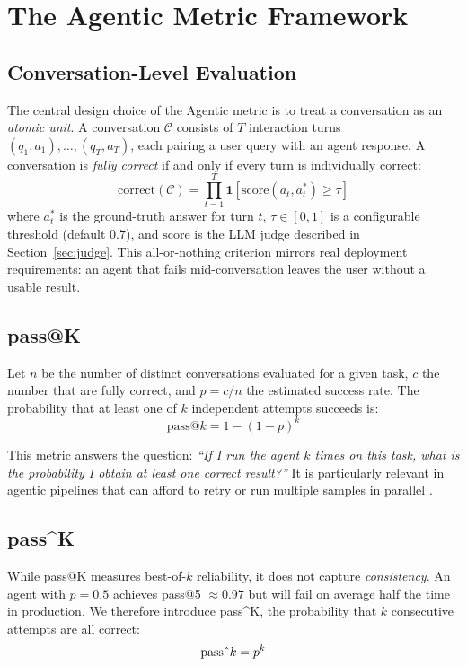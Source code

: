 \documentclass[11pt,a4paper]{article}
\begin{document}
\section{The Agentic Metric Framework}

\subsection{Conversation-Level Evaluation}

The central design choice of the Agentic metric is to treat a conversation as
an \emph{atomic unit}. A conversation $\mathcal{C}$ consists of $T$
interaction turns $(q_1, a_1), \ldots, (q_T, a_T)$, each pairing a user query
with an agent response. A conversation is \emph{fully correct} if and only if
every turn is individually correct:
\[
    \text{correct}(\mathcal{C}) =
    \prod_{t=1}^{T} \mathbf{1}\!\left[\text{score}(a_t, a_t^*) \geq \tau\right]
\]
where $a_t^*$ is the ground-truth answer for turn $t$, $\tau \in [0,1]$ is a
configurable threshold (default 0.7), and $\text{score}$ is the LLM judge
described in Section~\ref{sec:judge}. This all-or-nothing criterion mirrors real
deployment requirements: an agent that fails mid-conversation leaves the user
without a usable result.

\subsection{pass@K}
\label{sec:passk}

Let $n$ be the number of distinct conversations evaluated for a given task,
$c$ the number that are fully correct, and $p = c/n$ the estimated success
rate. The probability that at least one of $k$ independent attempts succeeds is:
\[
    \text{pass@}k = 1 - (1 - p)^k
\]

This metric answers the question: \emph{``If I run the agent $k$ times on
this task, what is the probability I obtain at least one correct result?''}
It is particularly relevant in agentic pipelines that can afford to retry or
run multiple samples in parallel \citep{humaneval2021}.

\subsection{pass\^{}K}
\label{sec:passpowk}

While pass@K measures best-of-$k$ reliability, it does not capture
\emph{consistency}. An agent with $p = 0.5$ achieves pass@5 $\approx 0.97$
but will fail on average half the time in production. We therefore introduce
pass\^{}K, the probability that $k$ consecutive attempts are all correct:
\[
    \text{pass\^{}}k = p^k
\]
\end{document}
